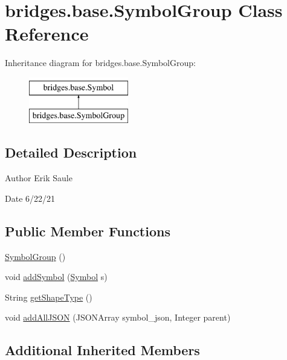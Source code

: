 \hypertarget{classbridges_1_1base_1_1_symbol_group}{}\section{bridges.\+base.\+Symbol\+Group Class Reference}
\label{classbridges_1_1base_1_1_symbol_group}
Inheritance diagram for bridges.\+base.\+Symbol\+Group\+:\begin{figure}[H]
\begin{center}
\leavevmode
\includegraphics[height=2.000000cm]{classbridges_1_1base_1_1_symbol_group}
\end{center}
\end{figure}


\subsection{Detailed Description}
\begin{DoxyAuthor}{Author}
Erik Saule
\end{DoxyAuthor}
\begin{DoxyDate}{Date}
6/22/21 
\end{DoxyDate}
\subsection*{Public Member Functions}
\begin{DoxyCompactItemize}
\item 
\hyperlink{classbridges_1_1base_1_1_symbol_group_a59cb891024b24450109cf16d07b0ad84}{Symbol\+Group} ()
\item 
void \hyperlink{classbridges_1_1base_1_1_symbol_group_a58c04ce707a24128b8a1aa29042e8bf2}{add\+Symbol} (\hyperlink{classbridges_1_1base_1_1_symbol}{Symbol} s)
\item 
String \hyperlink{classbridges_1_1base_1_1_symbol_group_a93c41b2ec53ed4dbfcc532cf61bea732}{get\+Shape\+Type} ()
\item 
void \hyperlink{classbridges_1_1base_1_1_symbol_group_a87afa9029b9f6def0e02ffd37ea6403f}{add\+All\+J\+S\+ON} (J\+S\+O\+N\+Array symbol\+\_\+json, Integer parent)
\end{DoxyCompactItemize}
\subsection*{Additional Inherited Members}


